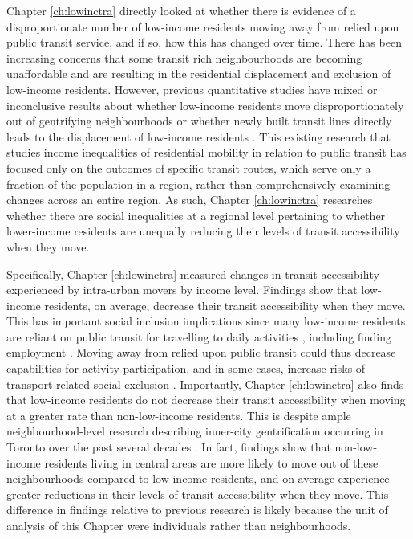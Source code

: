 Chapter \ref{ch:lowinctra} directly looked at whether there is evidence of a disproportionate number of low-income residents moving away from relied upon public transit service, and if so, how this has changed over time. There has been increasing concerns that some transit rich neighbourhoods are becoming unaffordable and are resulting in the residential displacement and exclusion of low-income residents. However, previous quantitative studies have mixed or inconclusive results about whether low-income residents move disproportionately out of gentrifying neighbourhoods or whether newly built transit lines directly leads to the displacement of low-income residents \cite{rayle_investigating_2015, zuk_gentrification_2018,padeiro_transit-oriented_2019,delmelle_transit-induced_2021}. This existing research that studies income inequalities of residential mobility in relation to public transit has focused only on the outcomes of specific transit routes, which serve only a fraction of the population in a region, rather than comprehensively examining changes across an entire region. As such, Chapter \ref{ch:lowinctra} researches whether there are social inequalities at a regional level pertaining to whether lower-income residents are unequally reducing their levels of transit accessibility when they move. 

Specifically, Chapter \ref{ch:lowinctra} measured changes in transit accessibility experienced by intra-urban movers by income level. Findings show that low-income residents, on average, decrease their transit accessibility when they move. This has important social inclusion implications since many low-income residents are reliant on public transit for travelling to daily activities \cite{allen_planning_2020,barri_can_2021}, including finding employment \cite{fransen_relationship_2019,bastiaanssen_does_2021}. Moving away from relied upon public transit could thus decrease capabilities for activity participation, and in some cases, increase risks of transport-related social exclusion \cite{lucas_transport_2012,allen_planning_2020}. Importantly, Chapter \ref{ch:lowinctra} also finds that low-income residents do not decrease their transit accessibility when moving at a greater rate than non-low-income residents. This is despite ample neighbourhood-level research describing inner-city gentrification occurring in Toronto over the past several decades \cite{hulchanski_three_2010,walks_gentrification_2021}. In fact, findings show that non-low-income residents living in central areas are more likely to move out of these neighbourhoods compared to low-income residents, and on average experience greater reductions in their levels of transit accessibility when they move. This difference in findings relative to previous research is likely because the unit of analysis of this Chapter were individuals rather than neighbourhoods.

